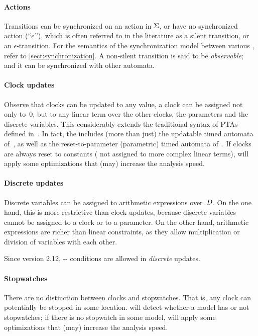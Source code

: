 \paragraph{Actions}
Transitions can be synchronized on an action in $\Sigma$, or have no synchronized action (``$\epsilon$''), which is often referred to in the literature as a silent transition, or an $\epsilon$-transition.
For the semantics of the synchronization model between various \IPTA{}, refer to \cref{sect:synchronization}.
A non-silent transition is said to be \emph{observable}; and it can be synchronized with other automata.

\paragraph{Clock updates}
Observe that clocks can be updated to any value, \ie{} a clock can be assigned not only to~0, but to any linear term over the other clocks, the parameters and the discrete variables.
This considerably extends the traditional syntax of PTAs defined in~\cite{AHV93}.
In fact, the \imitator{} includes (more than just) the updatable timed automata of~\cite{BDFP04}, as well as the reset-to-parameter (parametric) timed automata of~\cite{ALR18PresetTA}.
If clocks are always reset to constants (\ie{} not assigned to more complex linear terms), \imitator{} will apply some optimizations that (may) increase the analysis speed.

\paragraph{Discrete updates}
Discrete variables can be assigned to arithmetic expressions over~$D$.
On the one hand, this is more restrictive than clock updates, because discrete variables cannot be assigned to a clock or to a parameter.
On the other hand, arithmetic expressions are richer than linear constraints, as they allow multiplication or division of variables with each other.

Since version 2.12, -- conditions are allowed in \emph{discrete} updates.

\paragraph{Stopwatches}
There are no distinction between clocks and stopwatches.
That is, any clock can potentially be stopped in some location.
\imitator{} will detect whether a model has or not stopwatches; if there is no stopwatch in some model, \imitator{} will apply some optimizations that (may) increase the analysis speed.


